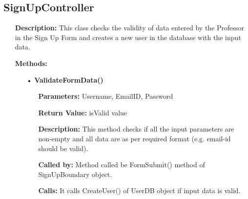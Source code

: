 \documentclass{scrreprt}
\begin{document}
\subsection{SignUpController}
\begin{enumerate}
\item[] \textbf{Description:} This class checks the validity of data entered by the Professor in the Sign Up Form and creates a new user in the database with the input data.
\item [] \textbf{Methods:} 
\begin{itemize}
\item [•] \textbf{ValidateFormData()}
\begin{itemize}
\item [] \textbf{Parameters:} Username, EmailID, Password  
\item [] \textbf{Return Value:} isValid value
\item [] \textbf{Description:} This method checks if all the input parameters are non-empty and all data are as per required format (e.g. email-id should be valid).
\item [] \textbf{Called by:} Method called be FormSubmit() method of SignUpBoundary object.
\item [] \textbf{Calls:} It calls CreateUser() of UserDB object if input data is valid.
\end{itemize}
\end{itemize}
\end{enumerate}
\end{document}
